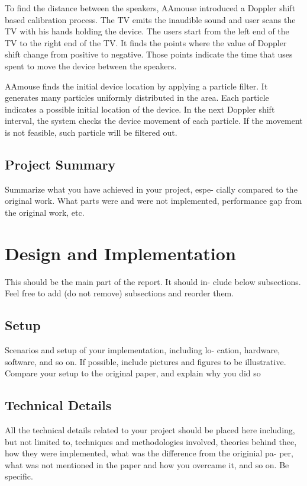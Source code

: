 \documentclass{acm_proc_article-sp}
\begin{document}
To find the distance between the speakers, AAmouse introduced a 
Doppler shift based calibration process. 
The TV emits the inaudible sound and user scans the TV with his hands
holding the device. The users start from the left end of the TV to the
right end of the TV.
It finds the points where the 
value of Doppler shift change from positive to negative. Those points
indicate the time that uses spent to move the device between the
speakers. 

AAmouse finds the initial device location by applying a particle 
filter. It generates many particles uniformly distributed in the 
area. Each particle indicates a possible initial location of the
device. In the next Doppler shift interval, the system checks the 
device movement of each particle. If the movement is not feasible,
such particle will be filtered out.

\subsection{Project Summary}
Summarize  what  you  have  achieved  in  your  project,  espe-
cially compared to the original work.  What parts were and
were  not  implemented,  performance  gap  from  the  original
work, etc.

\section{Design and Implementation} \label{design_and_implementation}
This should be the main part of the report.  It should in-
clude below subsections.  Feel free to add (do not remove)
subsections and reorder them.

\subsection{Setup}
Scenarios  and  setup  of  your  implementation,  including  lo-
cation,  hardware,  software,  and so on.  If possible,  include
pictures and figures to be illustrative.  Compare your setup
to the original paper, and explain why you did so

\subsection{Technical Details}
All  the  technical  details  related  to  your  project  should  be
placed  here  including,  but  not  limited  to,  techniques  and
methodologies involved, theories behind thee, how they were
implemented, what was the difference from the originial pa-
per,  what  was  not  mentioned  in  the  paper  and  how  you
overcame it, and so on.  Be specific.
\end{document}
